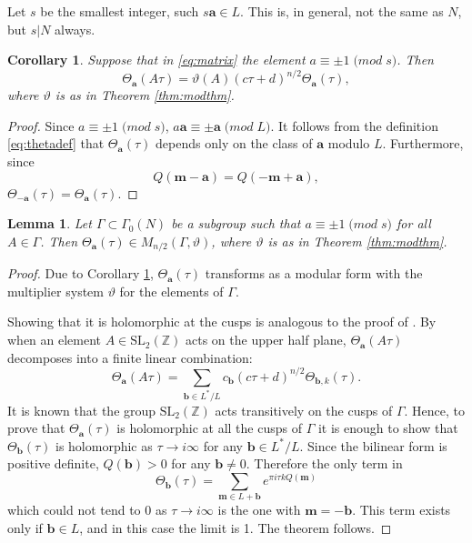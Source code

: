 \documentclass{article}
\newtheorem{lemma}[theorem]{Lemma}
\newtheorem{corollary}[theorem]{Corollary}
\theoremstyle{definition}
\newcommand{\ZZ} {{\mathbb Z}}		%
\begin{document}
Let $s$ be the smallest integer, such $s\mathbf{a} \in L$. This is, in general, not the same
as $N$, but $s|N$ always. 
\begin{corollary}
\label{cor:mult} 
Suppose that in \eqref{eq:matrix} the element $a \equiv \pm 1 \; \mathrm(mod\; s)$.
Then 
\[ \Theta_{\mathbf{a}}(A\tau)= \vartheta(A)(c\tau+d)^{n/2} \Theta_{\mathbf{a}}(\tau), \]
where $\vartheta$ is as in Theorem \ref{thm:modthm}.
\end{corollary}
\begin{proof}
Since $a \equiv \pm 1 \; \mathrm(mod\; s)$, $a \mathbf{a} \equiv \pm\mathbf{a} \; 
\mathrm(mod\; L)$. It follows from the definition \eqref{eq:thetadef} that 
$\Theta_{\mathbf{a}}(\tau)$ depends only on the class of $\mathbf{a}$ modulo $L$. 
Furthermore, since
\[ Q(\mathbf{m}-\mathbf{a})=Q(-\mathbf{m}+\mathbf{a}), \]
$\Theta_{-\mathbf{a}}(\tau)= \Theta_{\mathbf{a}}(\tau)$.
\end{proof}
\begin{lemma} 
\label{lem:mult2}
Let $\Gamma \subset \Gamma_0(N)$ be a subgroup such that $a \equiv \pm 1 \; \mathrm(mod\; s)$ for all $A \in \Gamma$. Then $\Theta_{\mathbf{a}}(\tau) \in M_{n/2}(\Gamma, \vartheta)$, where $\vartheta$ is as in Theorem \ref{thm:modthm}.
\end{lemma}
\begin{proof} Due to Corollary \ref{cor:mult}, $\Theta_{\mathbf{a}}(\tau)$ 
transforms as a modular form with the multiplier system $\vartheta$ for the elements of $\Gamma$. 
	
Showing that it is holomorphic at the cusps is analogous to the proof of 
\cite[Corollary 14.3.16]{cohen2017modular}. By \cite[Theorem 14.3.7]{cohen2017modular} when 
an element $A \in \textrm{SL}_2( \ZZ)$ acts on the upper half plane, 
$\Theta_{\mathbf{a}}(A\tau)$ decomposes into a finite linear combination:
\[ \Theta_{\mathbf{a}}(A\tau)=\sum_{\mathbf{b} \in 
L^{\ast}/L}c_{\mathbf{b}}(c\tau+d)^{n/2}\Theta_{\mathbf{b},k}(\tau). \]
It is known that the group $\textrm{SL}_2( \ZZ)$ acts transitively on the cusps of 
$\Gamma$.  Hence, to prove that $\Theta_{\mathbf{a}}(\tau)$ is holomorphic at all the cusps 
of $\Gamma$ it is enough to show that $\Theta_{\mathbf{b}}(\tau)$ is holomorphic as $\tau 
\to i\infty$ for any $\mathbf{b} \in L^{\ast}/L$. Since the bilinear form is positive 
definite, $Q(\mathbf{b})>0$ for any $\mathbf{b} \neq 0$. Therefore the only term in
\[\Theta_{\mathbf{b}}(\tau)= \sum_{\mathbf{m} \in L+\mathbf{b}}
 e^{\pi i \tau k Q(\mathbf{m})}\]
which could not tend to 0  as $\tau \to i\infty$ is the one with $\mathbf{m}=-\mathbf{b}$. 
This term exists only if $\mathbf{b} \in L$, and in this case the limit is 1. The theorem 
follows.
\end{proof}
\end{document}
